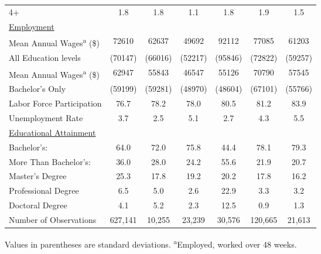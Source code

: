 \documentclass[11pt]{article}
\theoremstyle{definition}
\begin{document}
{\begin{center}
\begin{tabular}{l c c c c c c}
\hspace{2.5mm}4+ & 1.8 & 1.8 & 1.1 & 1.8 & 1.9 & 1.5 \\
\underline{Employment} & & & & & & \\
Mean Annual Wages\textsuperscript{a} (\$) & 72610 & 62637 & 49692 & 92112 & 77085 & 61203 \\
\hspace{2.5mm}All Education levels & (70147)& (66016) & (52217) & (95846) & (72822) & (59257) \\
Mean Annual Wages\textsuperscript{a} (\$) & 62947 & 55843 & 46547 & 55126 & 70790 & 57545 \\
\hspace{2.5mm}Bachelor's Only & (59199) & (59281) & (48970) & (48604) & (67101) & (55766) \\
Labor Force Participation & 76.7 & 78.2 & 78.0 & 80.5 & 81.2 & 83.9 \\
Unemployment Rate & 3.7 & 2.5 & 5.1 & 2.7 & 4.3 & 5.5 \\
\underline{Educational Attainment}  &  &  &  &  &  &  \\
Bachelor's:  & 64.0 & 72.0 & 75.8 & 44.4 & 78.1 & 79.3 \\
More Than Bachelor's:  & 36.0 & 28.0 & 24.2 & 55.6 & 21.9 & 20.7  \\
\hspace{2.5mm}Master's Degree & 25.3 & 17.8 & 19.2 & 20.2 & 17.8 & 16.2 \\
\hspace{2.5mm}Professional Degree & 6.5 & 5.0 & 2.6 & 22.9 & 3.3 & 3.2 \\
\hspace{2.5mm}Doctoral Degree & 4.1 & 5.2 & 2.3 & 12.5 & 0.9 & 1.3 \\
\hline
Number of Observations & 627,141 & 10,255 & 23,239 & 30,576 & 120,665 & 21,613 \\
\hline\hline
\end{tabular} 
\end{center}} 
\small{Values in parentheses are standard deviations. \textsuperscript{a}Employed, worked over 48 weeks.}
\end{document}
